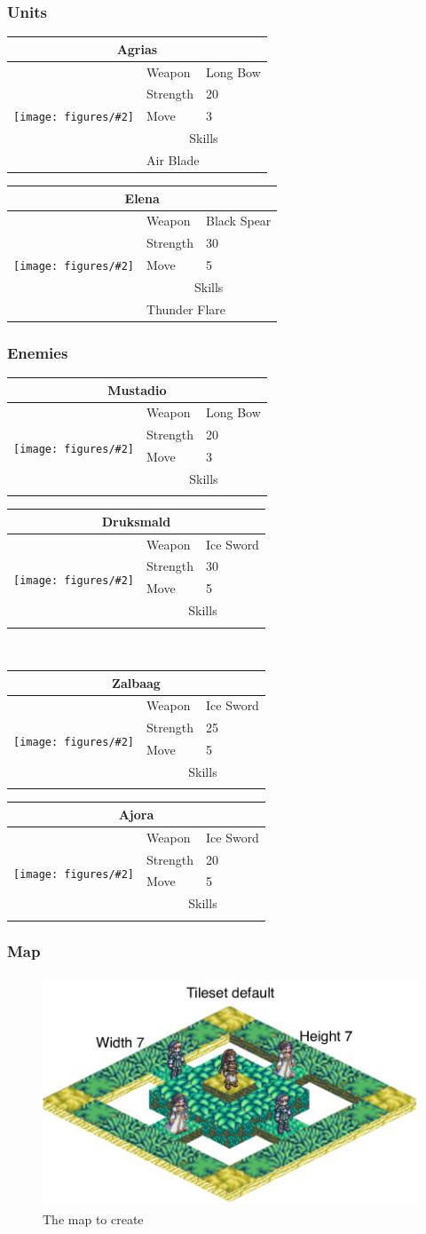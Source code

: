 \newcommand{\unit}[7]{\begin{tabular}{|p{1cm}|lp{2cm}|}
\hline
\multicolumn{3}{|c|}{#1} \\
\hline
\multirow{6}{*}{\texttt{[image: figures/\#2]}} 
 & Weapon    & #3 \\
 & Strength  & #4 \\
 & Move      & #5 \\
 \cline{2-3}
 & \multicolumn{2}{c|}{Skills} \\
 \cline{2-3}
 \ifstrempty{#6}{}{\foreach{\unitSkill}{}{#6}}
 & \multicolumn{2}{l|}{#7}\\
\hline
\end{tabular}
}

\newcommand\unitSkill[2]{
	& \multicolumn{2}{l|}{#2}\\
}
\subsubsection*{Units}
\unit{Agrias}{unit1.png}{Long Bow}{20}{3}{}{Air Blade}
\hspace{0.5cm}
\unit{Elena}{unit4.png}{Black Spear}{30}{5}{}{Thunder Flare}

\subsubsection*{Enemies}
\unit{Mustadio}{unit2.png}{Long Bow}{20}{3}{}{}
\hspace{0.5cm}
\unit{Druksmald}{unit3.png}{Ice Sword}{30}{5}{}{}
\\[0.5cm]
\unit{Zalbaag}{unit3.png}{Ice Sword}{25}{5}{}{}
\hspace{0.5cm}
\unit{Ajora}{unit3.png}{Ice Sword}{20}{5}{}{}


\clearpage
\subsubsection*{Map}
\begin{figure}[h!]
	\centering
		\includegraphics[height=2.7in]{figures/Task.pdf}
	\caption{The map to create}
	\label{fig:figures_Task}
\end{figure}


